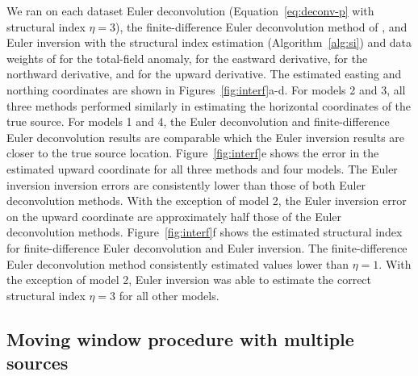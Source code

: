 We ran on each dataset Euler deconvolution (Equation~\ref{eq:deconv-p} with structural index $\eta=3$), the finite-difference Euler deconvolution method of \citet{Gerovska2005}, and Euler inversion with the structural index estimation (Algorithm~\ref{alg:si}) and data weights of \DefaultWeightsF{} for the total-field anomaly, \DefaultWeightsE{} for the eastward derivative, \DefaultWeightsN{} for the northward derivative, and \DefaultWeightsU{} for the upward derivative.
The estimated easting and northing coordinates are shown in Figures~\ref{fig:interf}a-d.
For models 2 and 3, all three methods performed similarly in estimating the horizontal coordinates of the true source.
For models 1 and 4, the Euler deconvolution and finite-difference Euler deconvolution results are comparable which the Euler inversion results are closer to the true source location.
Figure~\ref{fig:interf}e shows the error in the estimated upward coordinate for all three methods and four models.
The Euler inversion inversion errors are consistently lower than those of both Euler deconvolution methods.
With the exception of model 2, the Euler inversion error on the upward coordinate are approximately half those of the Euler deconvolution methods.
Figure~\ref{fig:interf}f shows the estimated structural index for finite-difference Euler deconvolution and Euler inversion.
The finite-difference Euler deconvolution method consistently estimated values lower than $\eta=1$.
With the exception of model 2, Euler inversion was able to estimate the correct structural index $\eta=3$ for all other models.


\subsection{Moving window procedure with multiple sources}
\label{sec:windows}

